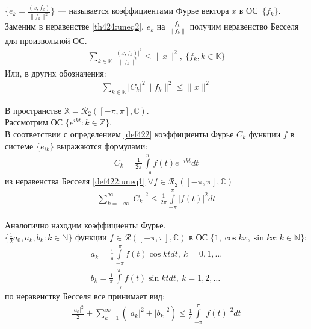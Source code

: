 \begin{definition}
  \label{def422}
  $\{e_k = \frac{(x, f_k)}{\|f_k\|^2} \}$ --- называется коэффициентами Фурье
  вектора $x$ в ОС~$\{f_k\}$. \\
  Заменим в неравенстве \eqref{th424:uneq2}, $e_k$ на $\frac{f_k}{\|f_k\|}$
  получим неравенство Бесселя для произвольной ОС.
  \begin{gather}
    \sum\limits_{k \in \mathbb{K}} \frac{|(x, f_k)|^2}{\|f_k\|^2} \leq \|x\|^2,
    \ \{f_k, k \in \mathbb{K}\}
    \label{def422:uneq1}
  \end{gather}
  Или, в других обозначения:
  \begin{gather*}
    \sum\limits_{k \in \mathbb{K}} |C_k|^2 \|f_k\|^2 \leq \|x\|^2
  \end{gather*}
\end{definition}

\begin{example}
  В пространстве $\mathbb{X} = \mathcal{R}_2([-\pi, \pi], \mathbb{C})$. \\
  Рассмотрим ОС $\{e^{ikt}: k \in \mathbb{Z}\}$. \\
  В соответствии с определением \eqref{def422} коэффициенты Фурье $C_k$ функции
  $f$ в системе $\{e_{ik}\}$ выражаются формулами:
  \begin{gather}
    C_k = \frac{1}{2\pi} \int\limits_{-\pi}^\pi f(t) e^{-ikt} dt
    \label{ex421:coef1}
  \end{gather}
  из неравенства Бесселя \eqref{def422:uneq1} $\forall f \in
  \mathcal{R}_2([-\pi,\pi], \mathbb{C})$
  \begin{gather}
    \sum\limits_{k = -\infty}^{\infty} |C_k|^2 \leq \frac{1}{2\pi}
    \int\limits_{-\pi}^\pi |f(t)|^2 dt
    \label{ex421:uneq1}
  \end{gather}
\end{example}

\begin{example}
  Аналогично находим коэффициенты Фурье. \\
  $\{\frac{1}{2} a_0, a_k, b_k : k \in \mathbb{N}\}$ функции $f \in
  \mathcal{R}([-\pi, \pi], \mathbb{C})$ в ОС $\{1, \cos kx, \sin kx : k \in
  \mathbb{N}\}$:
  \begin{gather}
    a_k = \frac{1}{\pi} \int\limits_{-\pi}^\pi f(t) \cos kt dt, \ k = 0, 1,
    \dots \label{ex422:coef1} \\
    b_k = \frac{1}{\pi} \int\limits_{-\pi}^\pi f(t) \sin kt dt, \ k = 1, 2,
    \dots \label{ex422:coef2}
  \end{gather}
  по неравенству Бесселя все принимает вид:
  \begin{gather}
    \frac{|a_0|^2}{2} + \sum\limits_{k = 1}^{\infty} (|a_k|^2 + |b_k|^2) \leq
    \frac{1}{\pi} \int\limits_{-\pi}^\pi |f(t)|^2 dt \label{ex422:uneq1}
  \end{gather}
\end{example}

